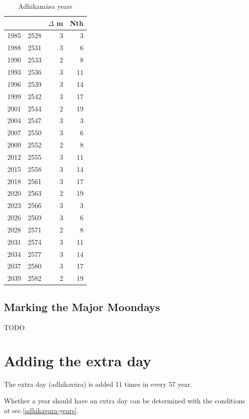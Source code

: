 \documentclass[11pt,oneside]{memoir-article}
\begin{document}
\begin{table}[h]
\caption{\label{tbl-cycle-adhikamasa} Adhikamāsa years}
\centering
\begin{tabular}{rrrr}
 &  & $\Delta$ m & Nth\\
\hline
1985 & 2528 & 3 & 3\\
1988 & 2531 & 3 & 6\\
1990 & 2533 & 2 & 8\\
1993 & 2536 & 3 & 11\\
1996 & 2539 & 3 & 14\\
1999 & 2542 & 3 & 17\\
2001 & 2544 & 2 & 19\\
2004 & 2547 & 3 & 3\\
2007 & 2550 & 3 & 6\\
2009 & 2552 & 2 & 8\\
2012 & 2555 & 3 & 11\\
2015 & 2558 & 3 & 14\\
2018 & 2561 & 3 & 17\\
2020 & 2563 & 2 & 19\\
2023 & 2566 & 3 & 3\\
2026 & 2569 & 3 & 6\\
2028 & 2571 & 2 & 8\\
2031 & 2574 & 3 & 11\\
2034 & 2577 & 3 & 14\\
2037 & 2580 & 3 & 17\\
2039 & 2582 & 2 & 19\\
\end{tabular}
\end{table}


\clearpage

\subsection{Marking the Major Moondays}
\label{sec-2-1-1}
\label{marking-the-moondays}

TODO

\section{Adding the extra day}
\label{sec-2-2}
\label{adding-extra-day}

The extra day (adhikavāra) is added 11 times in every 57 year.

Whether a year should have an extra day can be determined with the
conditions at sec.\ref{adhikavara-years}.
\end{document}
